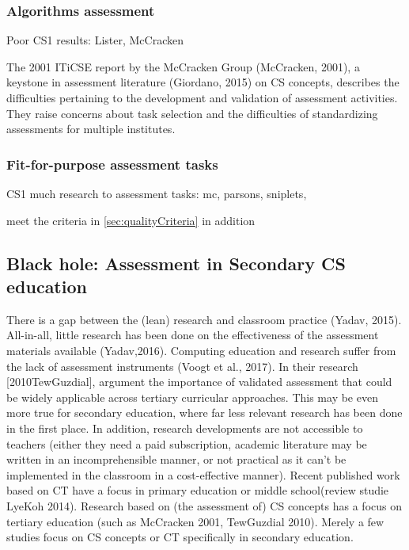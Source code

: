 \subsubsection*{Algorithms assessment}
Poor CS1 results: Lister, McCracken


The 2001 ITiCSE report by the McCracken Group (McCracken, 2001), a keystone in assessment literature (Giordano, 2015) on CS concepts, describes the difficulties pertaining to the development and validation of assessment activities. They raise concerns about task selection and the difficulties of standardizing assessments for multiple institutes.

\subsubsection*{Fit-for-purpose assessment tasks}
CS1 much research to assessment tasks: mc, parsons, sniplets,


meet the criteria in \ref{sec:qualityCriteria} in addition

\subsection{Black hole: Assessment in Secondary CS education}
There is a gap between the (lean) research and classroom practice (Yadav, 2015). All-in-all, little research has been done on the effectiveness of the assessment materials available (Yadav,2016). Computing education and research suffer from the lack of assessment instruments (Voogt et al., 2017). In their research [2010TewGuzdial], argument the importance of validated assessment that could be widely applicable across tertiary curricular approaches. This may be even more true for secondary education, where far less relevant research has been done in the first place. In addition, research developments are not accessible to teachers (either they need a paid subscription, academic literature may be written in an incomprehensible manner, or not practical as it can’t be implemented in the classroom in a cost-effective manner). Recent published work based on CT have a focus in primary education or middle school(review studie LyeKoh 2014). Research based on (the assessment of) CS concepts has a focus on tertiary education (such as McCracken 2001, TewGuzdial 2010). Merely a few studies focus on CS concepts or CT specifically in secondary education.



